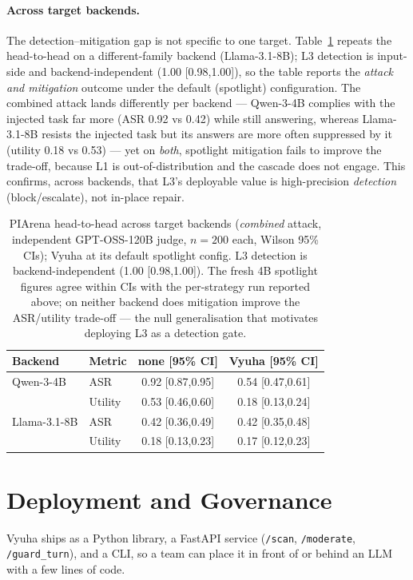 \documentclass[11pt]{article}
\begin{document}
\paragraph{Across target backends.} The detection--mitigation gap is not specific to one target.
Table~\ref{tab:backends} repeats the head-to-head on a different-family backend (Llama-3.1-8B); L3
detection is input-side and backend-independent (1.00 [0.98,1.00]), so the table reports the
\emph{attack and mitigation} outcome under the default (spotlight) configuration. The combined attack
lands differently per backend --- Qwen-3-4B complies with the injected task far more (ASR 0.92 vs 0.42)
while still answering, whereas Llama-3.1-8B resists the injected task but its answers are more often
suppressed by it (utility 0.18 vs 0.53) --- yet on \emph{both}, spotlight mitigation fails to improve
the trade-off, because L1 is out-of-distribution and the cascade does not engage. This confirms, across
backends, that L3's deployable value is high-precision \emph{detection} (block/escalate), not in-place
repair.
\begin{table}[t]
\centering\small
\begin{tabular}{llcc}
\toprule
Backend & Metric & none [95\% CI] & Vyuha [95\% CI] \\
\midrule
Qwen-3-4B & ASR & 0.92 [0.87,0.95] & 0.54 [0.47,0.61] \\
 & Utility & 0.53 [0.46,0.60] & 0.18 [0.13,0.24] \\
\midrule
Llama-3.1-8B & ASR & 0.42 [0.36,0.49] & 0.42 [0.35,0.48] \\
 & Utility & 0.18 [0.13,0.23] & 0.17 [0.12,0.23] \\
\bottomrule
\end{tabular}
\caption{PIArena head-to-head across target backends (\emph{combined} attack, independent
GPT-OSS-120B judge, $n{=}200$ each, Wilson 95\% CIs); Vyuha at its default spotlight config. L3
detection is backend-independent (1.00 [0.98,1.00]). The fresh 4B spotlight figures agree within CIs
with the per-strategy run reported above; on neither backend does mitigation improve the ASR/utility
trade-off --- the null generalisation that motivates deploying L3 as a detection gate.}
\label{tab:backends}
\end{table}

\section{Deployment and Governance}
Vyuha ships as a Python library, a FastAPI service (\texttt{/scan}, \texttt{/moderate},
\texttt{/guard\_turn}), and a CLI, so a team can place it in front of or behind an LLM with a few
lines of code.
\end{document}
